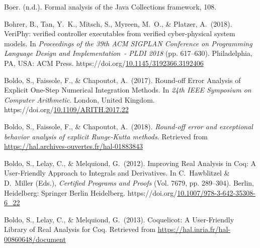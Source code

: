 \documentclass[12pt,twoside]{article}
\begin{document}
{\begin{thebibliography}{1079}
\mdbibitemlabel{}Boer. (n.d.). Formal analysis of the Java Collections framework, 108.%

\mdbibitemlabel{}Bohrer, B., Tan, Y.~K., Mitsch, S., Myreen, M.~O., \& Platzer, A.~(2018). VeriPhy: verified controller executables from verified cyber-physical system models. In \emph{Proceedings of the 39th ACM SIGPLAN Conference on Programming Language Design and Implementation~- PLDI 2018} (pp. 617–630). Philadelphia, PA, USA: ACM Press. https://doi.org/\href{https://dx.doi.org/10.1145/3192366.3192406}{10.1145/3192366.3192406}%

\mdbibitemlabel{}Boldo, S., Faissole, F., \& Chapoutot, A.~(2017). Round-off Error Analysis of Explicit One-Step Numerical Integration Methods. In \emph{24th IEEE Symposium on Computer Arithmetic}. London, United Kingdom. https://doi.org/\href{https://dx.doi.org/10.1109/ARITH.2017.22}{10.1109/ARITH.2017.22}%

\mdbibitemlabel{}Boldo, S., Faissole, F., \& Chapoutot, A.~(2018). \emph{Round-off error and exceptional behavior analysis of explicit Runge-Kutta methods}. Retrieved from \href{https://hal.archives-ouvertes.fr/hal-01883843}{{\ttfamily https://\hspace{0pt}hal.\hspace{0pt}archives-\hspace{0pt}ouvertes.\hspace{0pt}fr/\hspace{0pt}hal-\hspace{0pt}01883843}}%

\mdbibitemlabel{}Boldo, S., Lelay, C., \& Melquiond, G.~(2012). Improving Real Analysis in Coq: A User-Friendly Approach to Integrals and Derivatives. In C.~Hawblitzel \& D.~Miller (Eds.), \emph{Certified Programs and Proofs} (Vol. 7679, pp. 289–304). Berlin, Heidelberg: Springer Berlin Heidelberg. https://doi.org/\href{https://dx.doi.org/10.1007/978-3-642-35308-6_22}{10.1007/978-3-642-35308-6\_22}%

\mdbibitemlabel{}Boldo, S., Lelay, C., \& Melquiond, G.~(2013). Coquelicot: A User-Friendly Library of Real Analysis for Coq. Retrieved from \href{https://hal.inria.fr/hal-00860648/document}{{\ttfamily https://\hspace{0pt}hal.\hspace{0pt}inria.\hspace{0pt}fr/\hspace{0pt}hal-\hspace{0pt}00860648/\hspace{0pt}document}}%


\end{thebibliography}}
\end{document}
